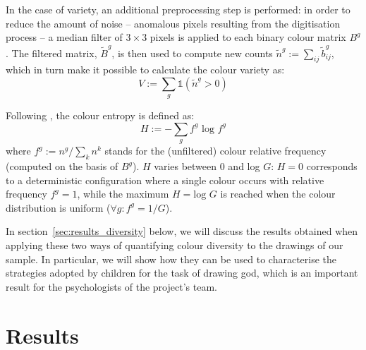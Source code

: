 \documentclass[11pt,a4paper]{article}
\begin{document}
In the case of variety, an additional preprocessing step is performed: in order to reduce the amount of noise -- anomalous pixels resulting from the digitisation process -- a median filter of \(3 \times 3\) pixels is applied to each binary colour matrix $B^{g}$. The filtered matrix, $\tilde{B}^{g}$, is then used to compute new counts $\tilde{n}^{g} := \sum_{ij}\tilde{b}_{ij}^{g}$, which in turn make it possible to calculate the colour variety as:
\begin{equation}
	V := \sum_{g}\mathds{1}(\tilde{n}^{g} > 0)
\end{equation}

Following \citet{Shannon1948}, the colour entropy is defined as:
\begin{equation}
	H := -\sum_{g} f^{g}\mbox{ log }f^{g}
\end{equation}
where $f^{g}:= n^{g}/\sum_{k}n^{k}$ stands for the (unfiltered) colour relative frequency (computed on the basis of $B^{g}$). $H$ varies between 0 and log $G$: $H=0$ corresponds to a deterministic configuration where a single colour occurs with relative frequency $f^{g} = 1$, while the maximum $H=\mbox{log }G$ is reached when the colour distribution is uniform ($\forall g: f^{g} = 1/G$).

In section~\ref{sec:results_diversity} below, we will discuss the results obtained when applying these two ways of quantifying colour diversity to the drawings of our sample. In particular, we will show how they can be used to characterise the strategies adopted by children for the task of drawing god, which is an important result for the psychologists of the project's team.


\section{Results}
\label{sec:results}
\end{document}
